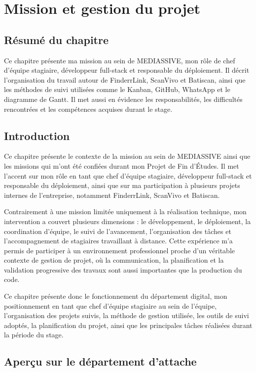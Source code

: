\chapter{Mission et gestion du projet}
\section*{Résumé du chapitre}

Ce chapitre présente ma mission au sein de MEDIASSIVE, mon rôle de chef d'équipe stagiaire, développeur full-stack et responsable du déploiement. Il décrit l'organisation du travail autour de FinderrLink, ScanVivo et Batiscan, ainsi que les méthodes de suivi utilisées comme le Kanban, GitHub, WhatsApp et le diagramme de Gantt. Il met aussi en évidence les responsabilités, les difficultés rencontrées et les compétences acquises durant le stage.

\section{Introduction}

Ce chapitre présente le contexte de la mission au sein de MEDIASSIVE ainsi que les missions qui m'ont été confiées durant mon Projet de Fin d'Études. Il met l'accent sur mon rôle en tant que chef d'équipe stagiaire, développeur full-stack et responsable du déploiement, ainsi que sur ma participation à plusieurs projets internes de l'entreprise, notamment FinderrLink, ScanVivo et Batiscan.

Contrairement à une mission limitée uniquement à la réalisation technique, mon intervention a couvert plusieurs dimensions : le développement, le déploiement, la coordination d'équipe, le suivi de l'avancement, l'organisation des tâches et l'accompagnement de stagiaires travaillant à distance. Cette expérience m'a permis de participer à un environnement professionnel proche d'un véritable contexte de gestion de projet, où la communication, la planification et la validation progressive des travaux sont aussi importantes que la production du code.

Ce chapitre présente donc le fonctionnement du département digital, mon positionnement en tant que chef d'équipe stagiaire au sein de l'équipe, l'organisation des projets suivis, la méthode de gestion utilisée, les outils de suivi adoptés, la planification du projet, ainsi que les principales tâches réalisées durant la période du stage.

\section{Aperçu sur le département d'attache}

